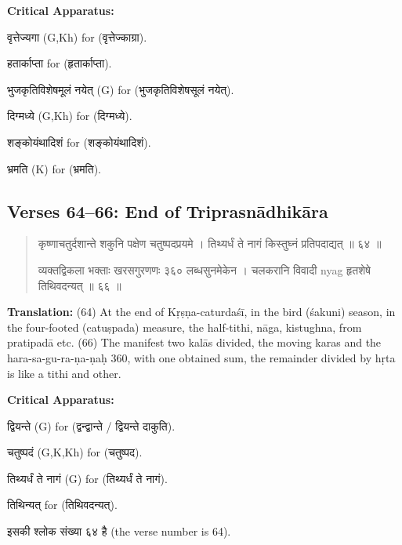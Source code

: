 \documentclass[11pt,a4paper]{article}
\newcommand{\dev}[1]{{\devanagarifont #1}}
\newenvironment{sanskritverse}{%
  \begin{quote}%
  \devanagarifont%
  \setlength{\leftmargin}{2em}%
}{\end{quote}}
\newenvironment{variants}{%
  \small%
  \color{varecolor}%
  \list{}{\leftmargin=2em\itemindent=-1em}%
}{\endlist}
\begin{document}
\textcolor{varecolor}{\textbf{Critical Apparatus:}}
\begin{variants}
\item[4.1] \dev{वृत्तेज्यगा} (G,Kh) \dev{for} (\dev{वृत्तेज्काग्रा}).
\item[4.2] \dev{हतार्काप्ता} \dev{for} (\dev{हृतार्काप्ता}).
\item[5.1] \dev{भुजकृतिविशेषमूलं नयेत्} (G) \dev{for} (\dev{भुजकृतिविशेषसूलं नयेत्}).
\item[6.1] \dev{दिग्मध्ये} (G,Kh) \dev{for} (\dev{दिग्मध्ये}).
\item[6.2] \dev{शङ्कोयंथादिशं} \dev{for} (\dev{शङ्कोयंथादिशं}).
\item[6.3] \dev{भ्रमति} (K) \dev{for} (\dev{भ्रमति}).
\end{variants}

\subsection*{Verses 64--66: End of Triprasnādhikāra}

\begin{sanskritverse}
\dev{कृष्णाचतुर्दशान्ते शकुनि पक्षेण चतुष्पदप्रयमे} ।
\dev{तिथ्यर्धं ते नागं किस्तुघ्नं प्रतिपदाद्यत् ॥ ६४ ॥}

\dev{व्यक्तद्विकला भक्ताः खरसगुरणणः ३६० लब्धसुनमेकेन} ।
\dev{चलकरानि विवादी nyag हृतशेषे तिथिवदन्यत् ॥ ६६ ॥}
\end{sanskritverse}

\textbf{Translation:} (64) At the end of Kṛṣṇa-caturdaśī, in the bird (śakuni) 
season, in the four-footed (catuṣpada) measure, the half-tithi, nāga, kistughna, 
from pratipadā etc. (66) The manifest two kalās divided, the moving karas and 
the hara-sa-gu-ra-ṇa-ṇaḥ 360, with one obtained sum, the remainder divided by hṛta 
is like a tithi and other.

\textcolor{varecolor}{\textbf{Critical Apparatus:}}
\begin{variants}
\item[64.1] \dev{द्वियन्ते} (G) \dev{for} (\dev{द्वन्द्वान्ते} / \dev{द्वियन्ते दाकुति}).
\item[64.2] \dev{चतुष्पदं} (G,K,Kh) \dev{for} (\dev{चतुष्पद}).
\item[64.3] \dev{तिथ्यर्धं ते नागं} (G) \dev{for} (\dev{तिथ्यर्धं ते नागं}).
\item[66.1] \dev{तिथिन्यत्} \dev{for} (\dev{तिथिवदन्यत्}).
\item[\dev{वि०}] \dev{इसकी श्लोक संख्या ६४ है} (the verse number is 64).
\end{variants}
\end{document}
